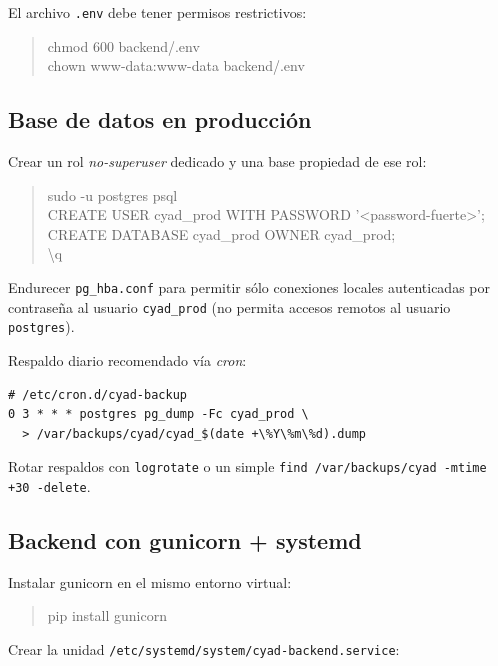 \documentclass{computacion}
\begin{document}
El archivo \texttt{.env} debe tener permisos restrictivos:

\begin{quote}\ttfamily
chmod 600 backend/.env \\
chown www-data:www-data backend/.env
\end{quote}

\subsection{Base de datos en producción}

Crear un rol \emph{no-superuser} dedicado y una base propiedad de ese rol:

\begin{quote}\ttfamily
sudo -u postgres psql \\
CREATE USER cyad\_prod WITH PASSWORD '\textless password-fuerte\textgreater'; \\
CREATE DATABASE cyad\_prod OWNER cyad\_prod; \\
\textbackslash q
\end{quote}

Endurecer \texttt{pg\_hba.conf} para permitir sólo conexiones locales autenticadas por contraseña al usuario \texttt{cyad\_prod} (no permita accesos remotos al usuario \texttt{postgres}).

Respaldo diario recomendado vía \emph{cron}:

\begin{Verbatim}[fontsize=\small, frame=single]
# /etc/cron.d/cyad-backup
0 3 * * * postgres pg_dump -Fc cyad_prod \
  > /var/backups/cyad/cyad_$(date +\%Y\%m\%d).dump
\end{Verbatim}

Rotar respaldos con \texttt{logrotate} o un simple \texttt{find /var/backups/cyad -mtime +30 -delete}.

\subsection{Backend con gunicorn + systemd}

Instalar gunicorn en el mismo entorno virtual:

\begin{quote}\ttfamily
pip install gunicorn
\end{quote}

Crear la unidad \texttt{/etc/systemd/system/cyad-backend.service}:
\end{document}
